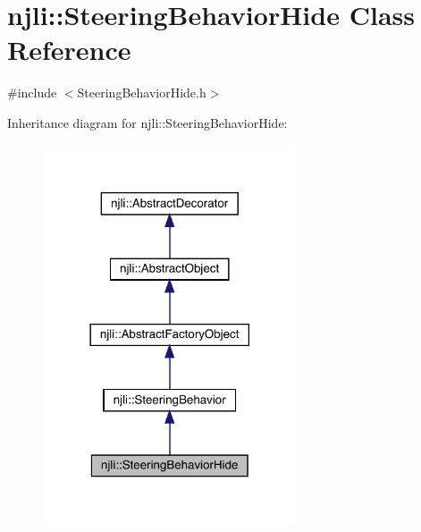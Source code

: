\hypertarget{classnjli_1_1_steering_behavior_hide}{}\section{njli\+:\+:Steering\+Behavior\+Hide Class Reference}
\label{classnjli_1_1_steering_behavior_hide}


{\ttfamily \#include $<$Steering\+Behavior\+Hide.\+h$>$}



Inheritance diagram for njli\+:\+:Steering\+Behavior\+Hide\+:\nopagebreak
\begin{figure}[H]
\begin{center}
\leavevmode
\includegraphics[width=213pt]{classnjli_1_1_steering_behavior_hide__inherit__graph}
\end{center}
\end{figure}


